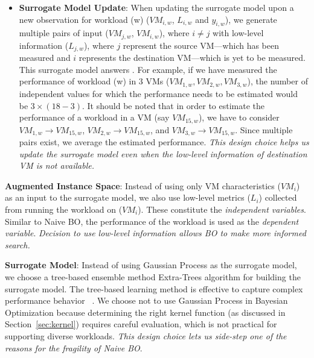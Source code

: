 \begin{itemize}
\item \textbf{Surrogate Model Update}: When updating the surrogate model upon a new observation for workload (w) ($\mathit{VM}_{i,w}$, $L_{i,w}$ and $y_{i,w}$), we generate multiple pairs of input ($\mathit{VM}_{j,w}$, $\mathit{VM}_{i,w}$), where $i\neq j$ with
low-level information ($L_{j,w}$), where $j$ represent the source VM---which has been measured and $i$ represents the destination VM---which is yet to be measured.
This surrogate model answers . For example, if we have measured the performance of workload (w) in 3 VMs ($VM_{1,w}, VM_{2,w}, VM_{3,w}$), the number of independent values for which the performance needs to be estimated would be $3 \times (18-3)$.
It should be noted that in order to estimate the performance of a workload in a VM (say $\mathit{VM}_{15,w}$),
we have to consider $\mathit{VM}_{1,w}\rightarrow\mathit{VM}_{15,w}$,  $\mathit{VM}_{2,w}\rightarrow\mathit{VM}_{15,w}$, and $\mathit{VM}_{3,w}\rightarrow\mathit{VM}_{15,w}$.  Since multiple pairs exist, we average the estimated performance. \textit{This design choice helps us update the surrogate model even when the low-level information of destination VM is not available.}

\end{itemize}

\iffalse
\noindent\textbf{Augmented Instance Space}:
Instead of using only VM characteristics ($\mathit{VM}_i$) as an input to the surrogate model,
we also use low-level metrics ($L_i$) collected from running the workload on  ($\mathit{VM}_i$). These constitute the \textit{independent variables}. Similar to Naive BO, the performance of the workload is used as the \textit{dependent variable}.
\textit{Decision to use low-level information allows BO to  make more informed search.}

\noindent\textbf{Surrogate Model}: Instead of using Gaussian Process as the surrogate model, we choose a tree-based ensemble method Extra-Trees algorithm for building the surrogate model. The tree-based learning method is effective
to capture complex performance behavior
~\cite{Wang2004, Yin2006, Noorshams2013,Hsu2016, Yadwadkar2017}. We choose not to use Gaussian Process in Bayesian Optimization because determining the right kernel function (as discussed in Section~\ref{sec:kernel}) requires careful evaluation, which is not practical for supporting diverse workloads. \textit{This design choice lets us side-step one of the reasons for the fragility of Naive BO}.

